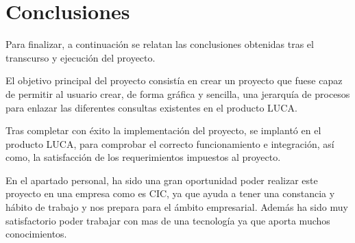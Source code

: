 	\chapter{Conclusiones}
	
	Para finalizar, a continuación se relatan las conclusiones obtenidas tras el transcurso y ejecución del proyecto.
	
	
	El objetivo principal del proyecto consistía en crear un proyecto que fuese capaz de permitir al usuario crear, de forma gráfica y sencilla, una jerarquía de procesos para enlazar las diferentes consultas existentes en el producto LUCA. 
	
	
	Tras completar con éxito la implementación del proyecto, se implantó en el producto LUCA, para comprobar el correcto funcionamiento e integración, así como, la satisfacción de los requerimientos impuestos al proyecto.
	
	
	En el apartado personal, ha sido una gran oportunidad poder realizar este proyecto en una empresa como es CIC, ya que ayuda a tener una constancia y hábito de trabajo y nos prepara para el ámbito empresarial. Además ha sido muy satisfactorio poder trabajar con mas de una tecnología ya que aporta muchos conocimientos.


	